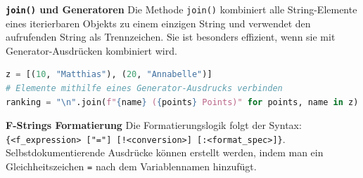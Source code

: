 \textbf{\texttt{join()} und Generatoren}
Die Methode \texttt{join()} kombiniert alle String-Elemente eines iterierbaren Objekts zu einem einzigen String und verwendet den aufrufenden String als Trennzeichen. Sie ist besonders effizient, wenn sie mit Generator-Ausdrücken kombiniert wird.

\begin{lstlisting}[language=Python]
z = [(10, "Matthias"), (20, "Annabelle")]
# Elemente mithilfe eines Generator-Ausdrucks verbinden
ranking = "\n".join(f"{name} ({points} Points)" for points, name in z)
\end{lstlisting}

\textbf{F-Strings Formatierung}
Die Formatierungslogik folgt der Syntax: \texttt{\{<f\_expression> ["="] [!<conversion>] [:<format\_spec>]\}}. Selbstdokumentierende Ausdrücke können erstellt werden, indem man ein Gleichheitszeichen \texttt{=} nach dem Variablennamen hinzufügt.

\vspace{1em}


